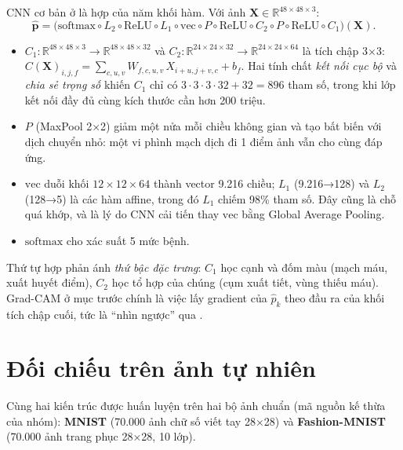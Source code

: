 CNN cơ bản ở  là hợp của năm khối hàm. Với ảnh $\mathbf X\in\mathbb R^{48\times48\times3}$:
\begin{equation}
\hat{\mathbf p} = \big(\mathrm{softmax}\circ L_2 \circ \mathrm{ReLU}\circ L_1 \circ \mathrm{vec} \circ P\circ\mathrm{ReLU}\circ C_2 \circ P\circ\mathrm{ReLU}\circ C_1\big)(\mathbf X).
\label{eq:ch3-compose}
\end{equation}
\begin{itemize}
  \item $C_1:\mathbb R^{48\times48\times3}\to\mathbb R^{48\times48\times32}$ và $C_2:\mathbb R^{24\times24\times32}\to\mathbb R^{24\times24\times64}$ là tích chập 3×3: $C(\mathbf X)_{i,j,f}=\sum_{c,u,v}W_{f,c,u,v}\,X_{i+u,j+v,c}+b_f$. Hai tính chất \emph{kết nối cục bộ} và \emph{chia sẻ trọng số} khiến $C_1$ chỉ có $3\cdot3\cdot3\cdot32+32=896$ tham số, trong khi lớp kết nối đầy đủ cùng kích thước cần hơn 200 triệu.
  \item $P$ (MaxPool 2×2) giảm một nửa mỗi chiều không gian và tạo bất biến với dịch chuyển nhỏ: một vi phình mạch dịch đi 1 điểm ảnh vẫn cho cùng đáp ứng.
  \item $\mathrm{vec}$ duỗi khối $12\times12\times64$ thành vector 9.216 chiều; $L_1$ (9.216→128) và $L_2$ (128→5) là các hàm affine, trong đó $L_1$ chiếm 98\% tham số. Đây cũng là chỗ quá khớp, và là lý do CNN cải tiến thay $\mathrm{vec}$ bằng Global Average Pooling.
  \item $\mathrm{softmax}$ cho xác suất 5 mức bệnh.
\end{itemize}
Thứ tự hợp phản ánh \emph{thứ bậc đặc trưng}: $C_1$ học cạnh và đốm màu (mạch máu, xuất huyết điểm), $C_2$ học tổ hợp của chúng (cụm xuất tiết, vùng thiếu máu). Grad-CAM ở mục trước chính là việc lấy gradient của $\hat p_k$ theo đầu ra của khối tích chập cuối, tức là ``nhìn ngược'' qua .

\section{Đối chiếu trên ảnh tự nhiên}
\label{sec:ch3-domains}

Cùng hai kiến trúc được huấn luyện trên hai bộ ảnh chuẩn (mã nguồn kế thừa của nhóm): \textbf{MNIST} (70.000 ảnh chữ số viết tay 28×28) và \textbf{Fashion-MNIST} (70.000 ảnh trang phục 28×28, 10 lớp).

